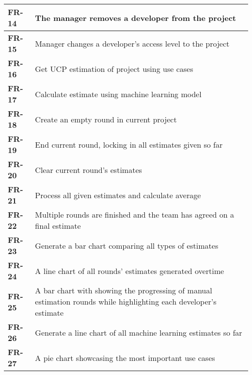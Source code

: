 \begin{center}
\begin{tabularx}{\textwidth}{|l|X|}
        \textbf{FR-14} & The manager removes a developer from the project \\
        \hline
    

        \textbf{FR-15} & Manager changes a developer's access level to the project \\
        \hline
    

        \textbf{FR-16} & Get UCP estimation of project using use cases \\
        \hline
    

        \textbf{FR-17} & Calculate estimate using machine learning model \\
        \hline
    

        \textbf{FR-18} & Create an empty round in current project \\
        \hline
    

        \textbf{FR-19} & End current round, locking in all estimates given so far \\
        \hline
    

        \textbf{FR-20} & Clear current round's estimates \\
        \hline
    

        \textbf{FR-21} & Process all given estimates and calculate average \\
        \hline
    

        \textbf{FR-22} & Multiple rounds are finished and the team has agreed on a final estimate \\
        \hline
    

        \textbf{FR-23} & Generate a bar chart comparing all types of estimates \\
        \hline
    

        \textbf{FR-24} & A line chart of all rounds' estimates generated overtime \\
        \hline
    

        \textbf{FR-25} & A bar chart with showing the progressing of manual estimation rounds while highlighting each developer's estimate \\
        \hline
    

        \textbf{FR-26} & Generate a line chart of all machine learning estimates so far \\
        \hline
    

        \textbf{FR-27} & A pie chart showcasing the most important use cases \\
        \hline
    


    \end{tabularx}
    \end{center}

